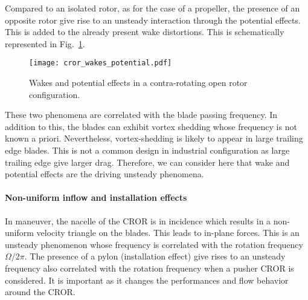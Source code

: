 Compared to an isolated rotor, as for the case of a propeller,
the presence of an opposite rotor give rise to an unsteady
interaction through the potential effects.
This is added to the already present wake distortions. This is
schematically represented in Fig.~\ref{fig:cror_wakes_potential}.
\begin{figure}[htb]
  \centering
  \texttt{[image: cror\_wakes\_potential.pdf]}
  \caption{Wakes and potential effects in a 
  contra-rotating open rotor configuration.}
  \label{fig:cror_wakes_potential}
\end{figure}
These two phenomena are correlated with the blade passing frequency.
In addition to this, the blades can exhibit vortex shedding whose frequency
is not known a priori.
Nevertheless,
vortex-shedding is likely to appear in large trailing edge blades.
This is not a common design in industrial configuration as large trailing edge
give larger drag. Therefore, we can consider here that 
wake and potential effects are the driving unsteady phenomena.

\paragraph{Non-uniform inflow and installation effects}

In maneuver, the nacelle of the CROR is in incidence
which results in a non-uniform velocity triangle on the blades.
This leads to in-plane forces. This is an unsteady phenomenon
whose frequency is correlated with the rotation frequency $\Omega / 2 \pi$.
The presence of a pylon (installation effect) give rises to an unsteady frequency
also correlated with the rotation frequency when a pusher CROR is considered.
It is important as it changes the performances and flow behavior around the CROR.
